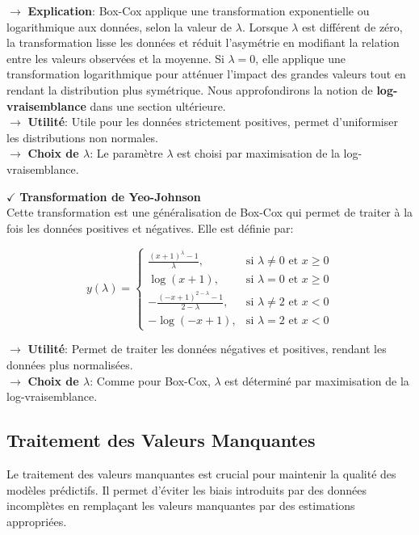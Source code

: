 \noindent \textbf{\(\rightarrow\)} \textbf{Explication}: Box-Cox applique une transformation exponentielle ou logarithmique aux données, selon la valeur de $\lambda$. Lorsque $\lambda$ est différent de zéro, la transformation lisse les données et réduit l'asymétrie en modifiant la relation entre les valeurs observées et la moyenne. Si $\lambda = 0$, elle applique une transformation logarithmique pour atténuer l'impact des grandes valeurs tout en rendant la distribution plus symétrique. Nous approfondirons la notion de \textbf{log-vraisemblance} dans une section ultérieure.\\
\textbf{\(\rightarrow\)} \textbf{Utilité}: Utile pour les données strictement positives, permet d'uniformiser les distributions non normales.\\
\textbf{\(\rightarrow\)} \textbf{Choix de $\lambda$}: Le paramètre $\lambda$ est choisi par maximisation de la log-vraisemblance.

\textbf{\(\checkmark\)} \textbf{Transformation de Yeo-Johnson} \\
Cette transformation est une généralisation de Box-Cox qui permet de traiter à la fois les données positives et négatives. Elle est définie par:

\[
y(\lambda) =
\begin{cases} 
\frac{(x + 1)^\lambda - 1}{\lambda}, & \text{si } \lambda \neq 0 \text{ et } x \geq 0 \\
\log(x + 1), & \text{si } \lambda = 0 \text{ et } x \geq 0 \\
-\frac{(-x + 1)^{2 - \lambda} - 1}{2 - \lambda}, & \text{si } \lambda \neq 2 \text{ et } x < 0 \\
-\log(-x + 1), & \text{si } \lambda = 2 \text{ et } x < 0
\end{cases}
\]

\noindent \textbf{\(\rightarrow\)} \textbf{Utilité}: Permet de traiter les données négatives et positives, rendant les données plus normalisées.\\
\textbf{\(\rightarrow\)} \textbf{Choix de $\lambda$}: Comme pour Box-Cox, $\lambda$ est déterminé par maximisation de la log-vraisemblance.

\subsection{Traitement des Valeurs Manquantes}

Le traitement des valeurs manquantes est crucial pour maintenir la qualité des modèles prédictifs. Il permet d'éviter les biais introduits par des données incomplètes en remplaçant les valeurs manquantes par des estimations appropriées.

